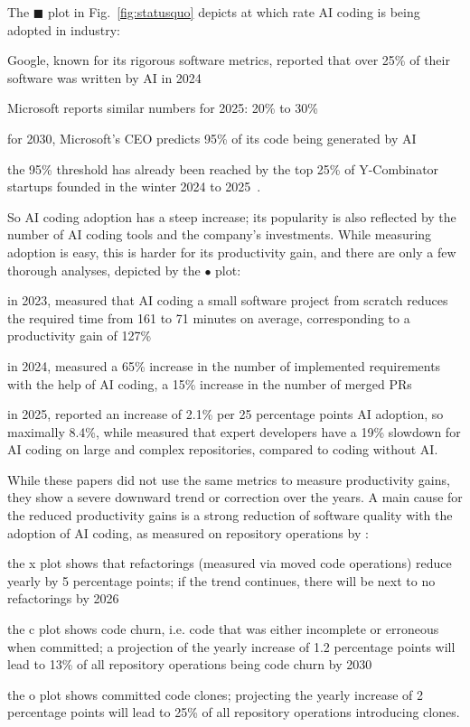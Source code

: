 \documentclass[twocolumn,german]{article}
\begin{document}
The {\color{blue}$\blacksquare$} plot in Fig.~\ref{fig:statusquo} depicts
at which rate AI coding is being adopted in industry:
\begin{compactitem}
\item Google, known for its rigorous software metrics,
  reported that over 25\% of their software was written by AI in 2024~\cite{RA24}
\item Microsoft reports similar numbers for 2025: 20\% to 30\%~\cite{MZ25}
\item for 2030, Microsoft's CEO predicts 95\% of its code being generated by AI~\cite{MG25}
\item the 95\% threshold has already been reached by the top 25\% of Y-Combinator startups
  founded in the winter 2024 to 2025~\cite{IM25}.
\end{compactitem}
So AI coding adoption has a steep increase; its popularity is also reflected by the number of AI coding tools and the company's investments. 
While measuring adoption is easy, this is harder for its productivity gain, and there are only a few thorough analyses, depicted by the {\color{green}$\bullet$} plot:
\begin{compactitem}
\item in 2023, \cite{peng23} measured that AI coding a small software project from scratch
  reduces the required time from 161 to 71 minutes on average, corresponding to a productivity gain of 127\%
\item in 2024, \cite{TW24} measured a 65\% increase in the number of implemented requirements with the help of AI coding,
  \cite{KC24} a 15\% increase in the number of merged PRs
\item in 2025, \cite{DORA25} reported an increase of 2.1\% per 25 percentage points AI adoption, so maximally 8.4\%, while
  \cite{JB25} measured that expert developers have a 19\% slowdown for AI coding on large and complex repositories,
  compared to coding without AI.
\end{compactitem}
While these papers did not use the same metrics to measure productivity gains,
they show a severe downward trend or correction over the years.
A main cause for the reduced productivity gains is a strong reduction of software quality
with the adoption of AI coding, as measured on repository operations by \cite{WH25}:
\begin{compactitem}
\item the {\color{orange}x} plot shows that refactorings (measured via moved code operations) reduce yearly by 5 percentage points; if the trend continues, there will be next to no refactorings by 2026
\item the {\color{red}c} plot shows code churn, i.e. code that was either incomplete or erroneous when committed; a projection of the yearly increase of 1.2 percentage points will lead to 13\% of all repository operations being code churn by 2030
\item the {\color{purple}o} plot shows committed code clones; projecting the yearly increase of 2 percentage points will lead to 25\% of all repository operations introducing clones.
\end{compactitem}
\end{document}
